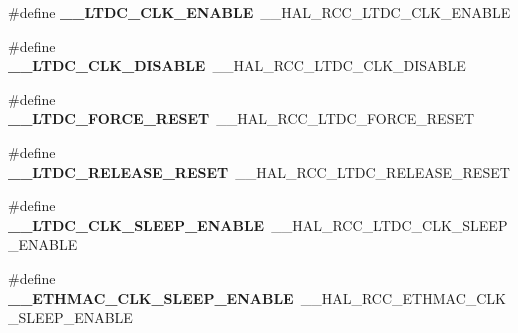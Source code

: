 \begin{DoxyCompactItemize}
\item 
\#define {\bfseries \+\_\+\+\_\+\+L\+T\+D\+C\+\_\+\+C\+L\+K\+\_\+\+E\+N\+A\+B\+LE}~\+\_\+\+\_\+\+H\+A\+L\+\_\+\+R\+C\+C\+\_\+\+L\+T\+D\+C\+\_\+\+C\+L\+K\+\_\+\+E\+N\+A\+B\+LE\hypertarget{group___h_a_l___r_c_c___aliased_gad84cdc420c9416fde8536d43f12b9807}{}\label{group___h_a_l___r_c_c___aliased_gad84cdc420c9416fde8536d43f12b9807}

\item 
\#define {\bfseries \+\_\+\+\_\+\+L\+T\+D\+C\+\_\+\+C\+L\+K\+\_\+\+D\+I\+S\+A\+B\+LE}~\+\_\+\+\_\+\+H\+A\+L\+\_\+\+R\+C\+C\+\_\+\+L\+T\+D\+C\+\_\+\+C\+L\+K\+\_\+\+D\+I\+S\+A\+B\+LE\hypertarget{group___h_a_l___r_c_c___aliased_ga36beee830404c49d03697162869ec113}{}\label{group___h_a_l___r_c_c___aliased_ga36beee830404c49d03697162869ec113}

\item 
\#define {\bfseries \+\_\+\+\_\+\+L\+T\+D\+C\+\_\+\+F\+O\+R\+C\+E\+\_\+\+R\+E\+S\+ET}~\+\_\+\+\_\+\+H\+A\+L\+\_\+\+R\+C\+C\+\_\+\+L\+T\+D\+C\+\_\+\+F\+O\+R\+C\+E\+\_\+\+R\+E\+S\+ET\hypertarget{group___h_a_l___r_c_c___aliased_ga768b510b2c77d1d9e28b8cba9ed5ae76}{}\label{group___h_a_l___r_c_c___aliased_ga768b510b2c77d1d9e28b8cba9ed5ae76}

\item 
\#define {\bfseries \+\_\+\+\_\+\+L\+T\+D\+C\+\_\+\+R\+E\+L\+E\+A\+S\+E\+\_\+\+R\+E\+S\+ET}~\+\_\+\+\_\+\+H\+A\+L\+\_\+\+R\+C\+C\+\_\+\+L\+T\+D\+C\+\_\+\+R\+E\+L\+E\+A\+S\+E\+\_\+\+R\+E\+S\+ET\hypertarget{group___h_a_l___r_c_c___aliased_ga481cafca3c88f7c7da318f9a6ab50cdb}{}\label{group___h_a_l___r_c_c___aliased_ga481cafca3c88f7c7da318f9a6ab50cdb}

\item 
\#define {\bfseries \+\_\+\+\_\+\+L\+T\+D\+C\+\_\+\+C\+L\+K\+\_\+\+S\+L\+E\+E\+P\+\_\+\+E\+N\+A\+B\+LE}~\+\_\+\+\_\+\+H\+A\+L\+\_\+\+R\+C\+C\+\_\+\+L\+T\+D\+C\+\_\+\+C\+L\+K\+\_\+\+S\+L\+E\+E\+P\+\_\+\+E\+N\+A\+B\+LE\hypertarget{group___h_a_l___r_c_c___aliased_ga3f970fe5172ef41349997acb72e5b92c}{}\label{group___h_a_l___r_c_c___aliased_ga3f970fe5172ef41349997acb72e5b92c}

\item 
\#define {\bfseries \+\_\+\+\_\+\+E\+T\+H\+M\+A\+C\+\_\+\+C\+L\+K\+\_\+\+S\+L\+E\+E\+P\+\_\+\+E\+N\+A\+B\+LE}~\+\_\+\+\_\+\+H\+A\+L\+\_\+\+R\+C\+C\+\_\+\+E\+T\+H\+M\+A\+C\+\_\+\+C\+L\+K\+\_\+\+S\+L\+E\+E\+P\+\_\+\+E\+N\+A\+B\+LE\hypertarget{group___h_a_l___r_c_c___aliased_ga719cdae441aa9421f0714b6359d02375}{}\label{group___h_a_l___r_c_c___aliased_ga719cdae441aa9421f0714b6359d02375}


\end{DoxyCompactItemize}
